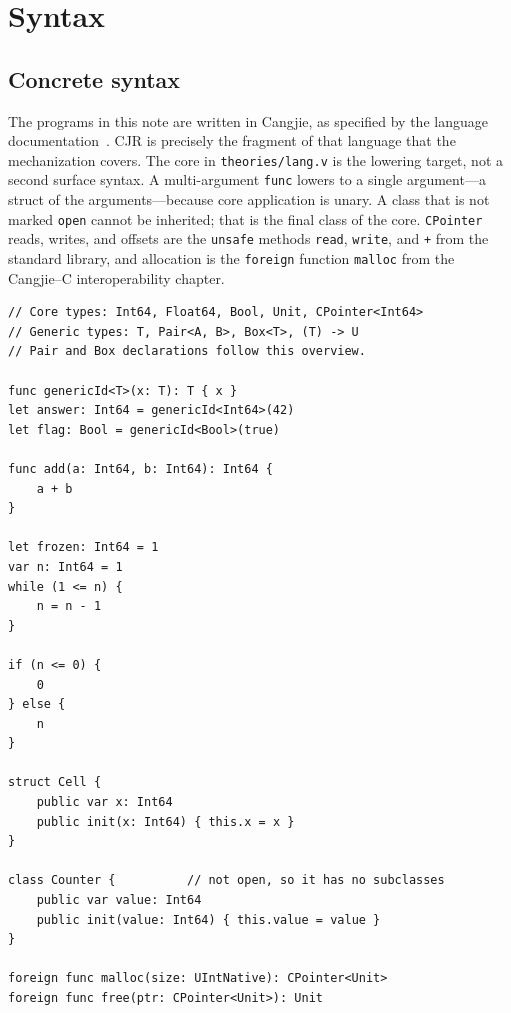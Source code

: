\documentclass[11pt]{article}
\newcommand{\cjr}{CJR}
\begin{document}
\clearpage
\section{Syntax}

\subsection{Concrete syntax}

The programs in this note are written in Cangjie, as specified by the language documentation~\cite{cangjie-docs}.
\cjr{} is precisely the fragment of that language that the mechanization covers.
The core in \texttt{theories/lang.v} is the lowering target, not a second surface syntax.
A multi-argument \texttt{func} lowers to a single argument---a struct of the arguments---because core application is unary.
A class that is not marked \texttt{open} cannot be inherited; that is the final class of the core.
\texttt{CPointer} reads, writes, and offsets are the \texttt{unsafe} methods \texttt{read}, \texttt{write}, and \texttt{+} from the standard library, and allocation is the \texttt{foreign} function \texttt{malloc} from the Cangjie--C interoperability chapter.

\noindent\begin{minipage}{\linewidth}
\begin{lstlisting}
// Core types: Int64, Float64, Bool, Unit, CPointer<Int64>
// Generic types: T, Pair<A, B>, Box<T>, (T) -> U
// Pair and Box declarations follow this overview.

func genericId<T>(x: T): T { x }
let answer: Int64 = genericId<Int64>(42)
let flag: Bool = genericId<Bool>(true)

func add(a: Int64, b: Int64): Int64 {
    a + b
}

let frozen: Int64 = 1
var n: Int64 = 1
while (1 <= n) {
    n = n - 1
}

if (n <= 0) {
    0
} else {
    n
}

struct Cell {
    public var x: Int64
    public init(x: Int64) { this.x = x }
}

class Counter {          // not open, so it has no subclasses
    public var value: Int64
    public init(value: Int64) { this.value = value }
}

foreign func malloc(size: UIntNative): CPointer<Unit>
foreign func free(ptr: CPointer<Unit>): Unit
\end{lstlisting}
\end{minipage}
\end{document}
